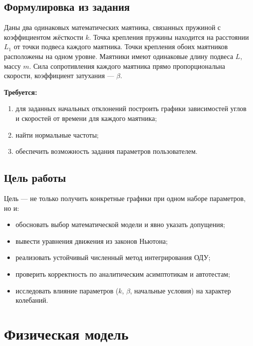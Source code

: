 \documentclass[12pt,a4paper]{article}
\begin{document}
\subsection{Формулировка из задания}

Даны два одинаковых математических маятника, связанных пружиной с коэффициентом
жёсткости \(k\). Точка крепления пружины находится на расстоянии \(L_1\) от точки
подвеса каждого маятника. Точки крепления обоих маятников расположены на одном
уровне. Маятники имеют одинаковые длину подвеса \(L\), массу \(m\). Сила
сопротивления каждого маятника прямо пропорциональна скорости, коэффициент
затухания --- \(\beta\).

\textbf{Требуется:}
\begin{enumerate}
  \item для заданных начальных отклонений построить графики зависимостей
        углов и скоростей от времени для каждого маятника;
  \item найти нормальные частоты;
  \item обеспечить возможность задания параметров пользователем.
\end{enumerate}

\subsection{Цель работы}

Цель --- не только получить конкретные графики при одном наборе параметров, но и:
\begin{itemize}
  \item обосновать выбор математической модели и явно указать допущения;
  \item вывести уравнения движения из законов Ньютона;
  \item реализовать устойчивый численный метод интегрирования ОДУ;
  \item проверить корректность по аналитическим асимптотикам и автотестам;
  \item исследовать влияние параметров (\(k\), \(\beta\), начальные условия)
        на характер колебаний.
\end{itemize}

\section{Физическая модель}
\end{document}
